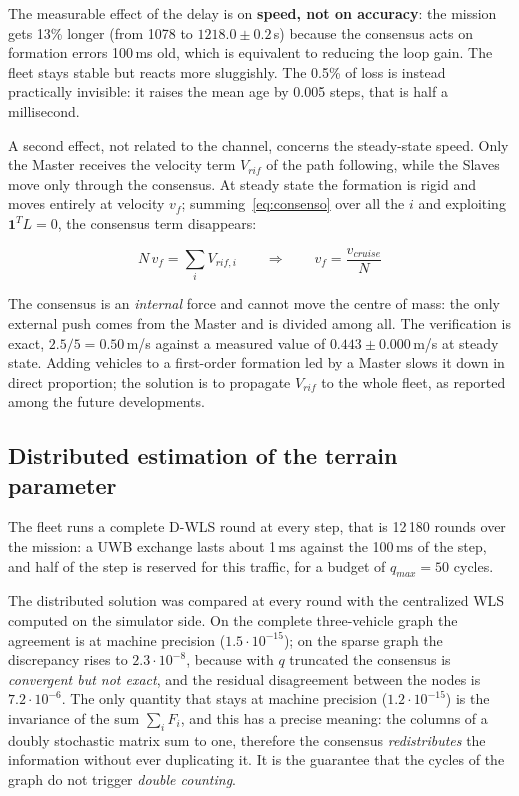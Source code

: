 \documentclass[conference,9pt]{IEEEtran}
\begin{document}
The measurable effect of the delay is on \textbf{speed, not on accuracy}: the
mission gets 13\% longer (from 1078 to $1218.0 \pm 0.2$\,s) because the
consensus acts on formation errors 100\,ms old, which is equivalent to reducing
the loop gain. The fleet stays stable but reacts more sluggishly. The 0.5\% of
loss is instead practically invisible: it raises the mean age by 0.005 steps,
that is half a millisecond.

A second effect, not related to the channel, concerns the steady-state speed.
Only the Master receives the velocity term $V_{rif}$ of the path following,
while the Slaves move only through the consensus. At steady state the formation
is rigid and moves entirely at velocity $v_f$; summing~\eqref{eq:consenso} over
all the $i$ and exploiting $\mathbf{1}^T L = 0$, the consensus term disappears:

\begin{equation}
N\,v_f = \sum_i V_{rif,i} \qquad\Longrightarrow\qquad
v_f = \frac{v_{cruise}}{N}
\label{eq:velflotta}
\end{equation}

The consensus is an \emph{internal} force and cannot move the centre of mass:
the only external push comes from the Master and is divided among all. The
verification is exact, $2.5/5 = 0.50$\,m/s against a measured value of
$0.443 \pm 0.000$\,m/s at steady state. Adding vehicles to a first-order
formation led by a Master slows it down in direct proportion; the solution is
to propagate $V_{rif}$ to the whole fleet, as reported among the future
developments.

\subsection{Distributed estimation of the terrain parameter}

The fleet runs a complete D-WLS round at every step, that is 12\,180 rounds
over the mission: a UWB exchange lasts about 1\,ms against the 100\,ms of the
step, and half of the step is reserved for this traffic, for a budget of
$q_{max} = 50$ cycles.

The distributed solution was compared at every round with the centralized WLS
computed on the simulator side. On the complete three-vehicle graph the
agreement is at machine precision ($1.5\cdot10^{-15}$); on the sparse graph the
discrepancy rises to $2.3\cdot10^{-8}$, because with $q$ truncated the
consensus is \emph{convergent but not exact}, and the residual disagreement
between the nodes is $7.2\cdot10^{-6}$. The only quantity that stays at machine
precision ($1.2\cdot10^{-15}$) is the invariance of the sum $\sum_i F_i$, and
this has a precise meaning: the columns of a doubly stochastic matrix sum to
one, therefore the consensus \emph{redistributes} the information without ever
duplicating it. It is the guarantee that the cycles of the graph do not trigger
\emph{double counting}.
\end{document}
